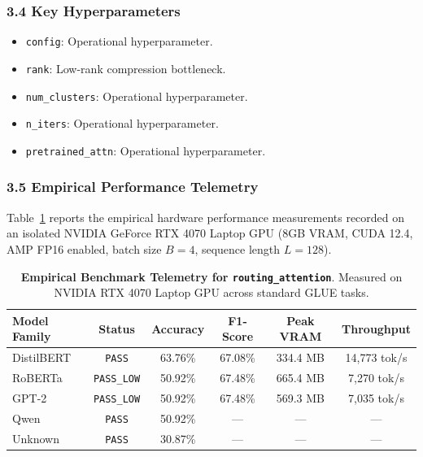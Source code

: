 \subsubsection*{3.4 Key Hyperparameters}
\begin{itemize}
    \item \texttt{config}: Operational hyperparameter.
    \item \texttt{rank}: Low-rank compression bottleneck.
    \item \texttt{num\_clusters}: Operational hyperparameter.
    \item \texttt{n\_iters}: Operational hyperparameter.
    \item \texttt{pretrained\_attn}: Operational hyperparameter.
\end{itemize}

\subsubsection*{3.5 Empirical Performance Telemetry}
Table~\ref{tab:telemetry_routing_attention} reports the empirical hardware performance measurements recorded on an isolated NVIDIA GeForce RTX 4070 Laptop GPU (8GB VRAM, CUDA 12.4, AMP FP16 enabled, batch size $B=4$, sequence length $L=128$).

\begin{table}[h]
\centering
\small
\caption{\textbf{Empirical Benchmark Telemetry for \texttt{routing\_attention}}. Measured on NVIDIA RTX 4070 Laptop GPU across standard GLUE tasks.}
\label{tab:telemetry_routing_attention}
\begin{tabular*}{\columnwidth}{@{\extracolsep{\fill}}lccccc}
\toprule
\textbf{Model Family} & \textbf{Status} & \textbf{Accuracy} & \textbf{F1-Score} & \textbf{Peak VRAM} & \textbf{Throughput} \\
\midrule
DistilBERT & \texttt{PASS} & 63.76\% & 67.08\% & 334.4 MB & 14,773 tok/s \\
RoBERTa & \texttt{PASS\_LOW} & 50.92\% & 67.48\% & 665.4 MB & 7,270 tok/s \\
GPT-2 & \texttt{PASS\_LOW} & 50.92\% & 67.48\% & 569.3 MB & 7,035 tok/s \\
Qwen & \texttt{PASS} & 50.92\% & --- & --- & --- \\
Unknown & \texttt{PASS} & 30.87\% & --- & --- & --- \\
\bottomrule
\end{tabular*}
\end{table}

